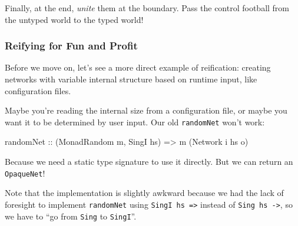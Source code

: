 \documentclass[]{article}
\newenvironment{Shaded}{}{}
\newcommand{\KeywordTok}[1]{\textcolor[rgb]{0.00,0.44,0.13}{\textbf{{#1}}}}
\newcommand{\DataTypeTok}[1]{\textcolor[rgb]{0.56,0.13,0.00}{{#1}}}
\newcommand{\CommentTok}[1]{\textcolor[rgb]{0.38,0.63,0.69}{\textit{{#1}}}}
\newcommand{\OtherTok}[1]{\textcolor[rgb]{0.00,0.44,0.13}{{#1}}}
\newcommand{\FunctionTok}[1]{\textcolor[rgb]{0.02,0.16,0.49}{{#1}}}
\newcommand{\NormalTok}[1]{{#1}}
\begin{document}
Finally, at the end, \emph{unite} them at the boundary. Pass the control
football from the untyped world to the typed world!

\subsubsection{Reifying for Fun and Profit}\label{reifying-for-fun-and-profit}

Before we move on, let's see a more direct example of reification: creating
networks with variable internal structure based on runtime input, like
configuration files.

Maybe you're reading the internal size from a configuration file, or maybe you
want it to be determined by user input. Our old \texttt{randomNet} won't work:

\begin{Shaded}
\begin{Highlighting}[]
\OtherTok{randomNet ::} \NormalTok{(}\DataTypeTok{MonadRandom} \NormalTok{m, }\DataTypeTok{SingI} \NormalTok{hs)}
          \OtherTok{=>} \NormalTok{m (}\DataTypeTok{Network} \NormalTok{i hs o)}
\end{Highlighting}
\end{Shaded}

Because we need a static type signature to use it directly. But we can return an
\texttt{OpaqueNet}!

\begin{Shaded}
\end{Shaded}

Note that the implementation is slightly awkward because we had the lack of
foresight to implement \texttt{randomNet} using
\texttt{SingI\ hs\ =\textgreater{}} instead of
\texttt{Sing\ hs\ -\textgreater{}}, so we have to ``go from \texttt{Sing} to
\texttt{SingI}''.
\end{document}

